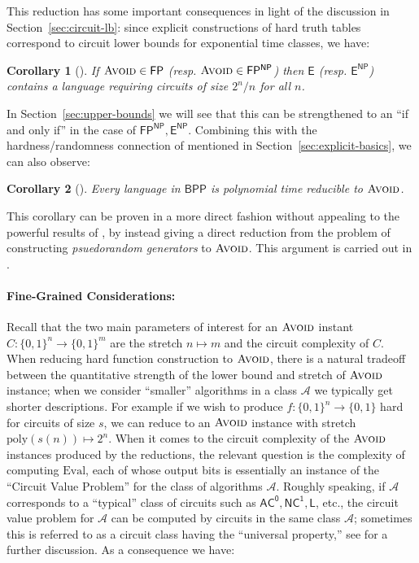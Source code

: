 \documentclass[11pt]{article}
\newtheorem{corollary}{Corollary}
\newcommand{\B}{\{0,1\}}
\newcommand{\poly}{\mathrm{poly}}
\newcommand{\avoid}{\textsc{Avoid}}
\begin{document}
This reduction has some important consequences in light of the discussion in Section~\ref{sec:circuit-lb}: since explicit constructions of hard truth tables correspond to circuit lower bounds for exponential time classes, we have:
\begin{corollary}[\cite{Korten1}]
If $\avoid \in \mathsf{FP}$ (resp. $\avoid \in \mathsf{FP^{NP}}$) then $\mathsf{E}$ (resp. $\mathsf{E^{NP}}$) contains a language requiring circuits of size $2^n/n$ for all $n$.
\end{corollary}
In Section~\ref{sec:upper-bounds} we will see that this can be strengthened to an ``if and only if'' in the case of $\mathsf{FP^{NP}}, \mathsf{E^{NP}}$. Combining this with the hardness/randomness connection of \cite{NW,IW} mentioned in Section~\ref{sec:explicit-basics}, we can also observe:

\begin{corollary}[\cite{Korten1}]
Every language in $\mathsf{BPP}$ is polynomial time reducible to $\avoid$.
\end{corollary}

This corollary can be proven in a more direct fashion without appealing to the powerful results of \cite{NW,IW}, by instead giving a direct reduction from the problem of constructing \emph{psuedorandom generators} to $\avoid$. This argument is carried out in \cite{Korten1}.

\paragraph{Fine-Grained Considerations:} Recall that the two main parameters of interest for an $\avoid$ instant $C: \B^n \to \B^m$ are the stretch $n \mapsto m$ and the circuit complexity of $C$. When reducing hard function construction to $\avoid$, there is a natural tradeoff between the quantitative strength of the lower bound and stretch of $\avoid$ instance; when we consider ``smaller'' algorithms in a class $\mathcal{A}$ we typically get shorter descriptions. For example if we wish to produce $f: \B^n \to \B$ hard for circuits of size $s$, we can reduce to an $\avoid$ instance with stretch $\poly(s(n)) \mapsto 2^n$.
When it comes to the circuit complexity of the $\avoid$ instances produced by the reductions, the relevant question is the complexity of computing $\mathrm{Eval}$, each of whose output bits is essentially an instance of the ``Circuit Value Problem'' for the class of algorithms $\mathcal{A}$. Roughly speaking, if $\mathcal{A}$ corresponds to a ``typical'' class of circuits such as $\mathsf{AC^0}, \mathsf{NC^1}, \mathsf{L}$, etc., the circuit value problem for $\mathcal{A}$ can be computed by circuits in the same class $\mathcal{A}$; sometimes this is referred to as a circuit class having the ``universal property,'' see \cite{RSW} for a further discussion. As a consequence we have:
\end{document}
